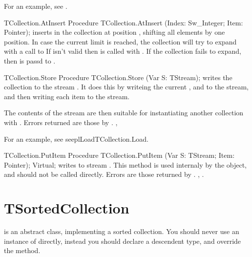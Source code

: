 For an example, see .

\begin{procedure}{TCollection.AtInsert}
\Declaration
Procedure TCollection.AtInsert (Index: Sw\_Integer; Item: Pointer);
\Description
{} inserts  in the collection at position ,
shifting all elements by one position. In case the current limit is reached,
the collection will try to expand with a call to 
\Errors
If  isn't valid then  is called
with . If the collection fails to expand, then
 is passd to .
\SeeAlso
{}
\end{procedure}



\begin{procedure}{TCollection.Store}
\Declaration
Procedure TCollection.Store (Var S: TStream);
\Description
{} writes the collection to the stream . It does
this by writeing the current ,  and 
to the stream, and then writing each item to the stream.

The contents of the stream are then suitable for instantiating another
collection with .
\Errors
Errors returned are those by .
\SeeAlso
{}, 
\end{procedure}

For an example, see seepl{Load}{TCollection.Load}.

\begin{procedure}{TCollection.PutItem}
\Declaration
Procedure TCollection.PutItem (Var S: TStream; Item: Pointer); Virtual;
\Description
{} writes  to stream . This method is used
internaly by the  object, and should not be called
directly.
\Errors
Errors are those returned by .
\SeeAlso
{}, .
\end{procedure}

\section{TSortedCollection}
\label{se:TSortedCollection}

 is an abstract class, implementing a sorted
collection. You should never use an instance of 
directly, instead you should declare a descendent type, and override the
 method.

